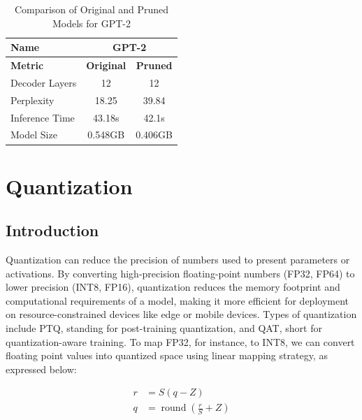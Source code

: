 \documentclass{article}
\begin{document}
    \begin{table}[h!]
        \centering
        \begin{tabular}{lcc}
            \toprule
            \textbf{Name}         & \multicolumn{2}{c}{\textbf{GPT-2}} \\ \midrule
            \textbf{Metric}       & \textbf{Original} & \textbf{Pruned} \\ \midrule
            Decoder Layers        & 12                     & 12                     \\
            Perplexity            & 18.25                  & 39.84                  \\
            Inference Time        & 43.18s                 & 42.1s                  \\
            Model Size            & 0.548GB                & 0.406GB                \\ \bottomrule
        \end{tabular}
        \caption{Comparison of Original and Pruned Models for GPT-2}
        \label{tab:gpt2_comparison_pruning}
    \end{table}


    \section{Quantization}
    \subsection{Introduction}
    \hspace*{1em} Quantization can reduce the precision of numbers used to present parameters or activations. By converting high-precision floating-point numbers (FP32, FP64) to lower precision (INT8, FP16), quantization reduces the memory footprint and computational requirements of a model, making it more efficient for deployment on resource-constrained devices like edge or mobile devices. Types of quantization include PTQ, standing for post-training quantization, and QAT, short for quantization-aware training. To map FP32, for instance, to INT8, we can convert floating point values into quantized space using linear mapping strategy, as expressed below:


    \begin{align}
        r &= S(q-Z) \\
        q &= \operatorname{round}\left(\frac{r}{S} + Z\right)
    \end{align}
\end{document}
